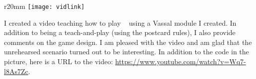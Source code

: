 \documentclass[../TacSubGameRules.tex]{subfiles}
\begin{document}
\begin{wrapfigure}{r}{20mm}
    \centering
    \texttt{[image: vidlink]}
\end{wrapfigure}
I created a video teaching how to play \gametitle~ using a Vassal module I created.
In addition to being a teach-and-play (using the postcard rules), I also provide comments on the game design.
I am pleased with the video and am glad that the unrehearsed scenario turned out to be interesting.
In addition to the code in the picture, here is a URL to the video: \url{https://www.youtube.com/watch?v=Wq7-l8As7Zc}.
\end{document}

